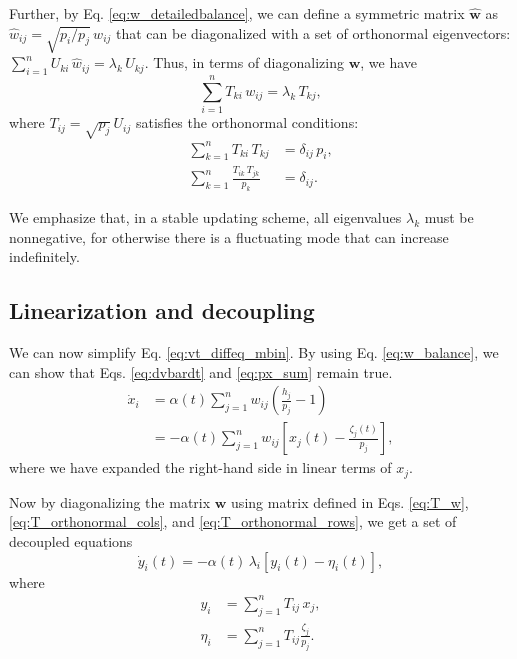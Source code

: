 \documentclass[reprint]{revtex4-1}
\begin{document}
Further, by Eq. \eqref{eq:w_detailedbalance},
we can define a symmetric matrix $\hat{\mathbf w}$
as $\hat w_{ij} = \sqrt{p_i/p_j} \, w_{ij}$
that can be diagonalized
with a set of orthonormal eigenvectors:
%
$\sum_{i = 1}^n U_{ki} \, \hat w_{ij} = \lambda_k \, U_{kj}$.
%
Thus,
in terms of diagonalizing $\mathbf w$, we have
\begin{equation}
  \sum_{i = 1}^n T_{ki} \, w_{ij} = \lambda_k \, T_{kj},
  \label{eq:T_w}
\end{equation}
where
$T_{ij} = \sqrt{p_j} \, U_{ij}$ satisfies
the orthonormal conditions:
%
\begin{align}
\sum_{k = 1}^n T_{ki} \, T_{kj}
&= \delta_{ij} \, p_i,
\label{eq:T_orthonormal_cols}
\\
\sum_{k = 1}^n \frac{ T_{ik} \, T_{jk} }{ p_k }
&= \delta_{ij}.
\label{eq:T_orthonormal_rows}
\end{align}



We emphasize that, in a stable updating scheme,
all eigenvalues $\lambda_k$ must be nonnegative,
for otherwise there is a fluctuating mode
that can increase indefinitely.



\subsection{Linearization and decoupling}



We can now simplify Eq. \eqref{eq:vt_diffeq_mbin}.
%
By using Eq. \eqref{eq:w_balance},
we can show that
Eqs. \eqref{eq:dvbardt} and \eqref{eq:px_sum}
remain true.
%
%
$$
\begin{aligned}
\dot x_i
&= \alpha(t) \sum_{j=1}^n w_{ij}
\left( \frac{ h_j } { p_j }  - 1 \right)
\\
&=
-\alpha(t) \sum_{j = 1}^n
w_{ij} \left[ x_j(t) - \frac{\zeta_j (t)}{p_j} \right],
\end{aligned}
$$
where
we have expanded the right-hand side
in linear terms of $x_j$.


Now by diagonalizing the matrix $\mathbf w$
using matrix defined in Eqs. \eqref{eq:T_w},
\eqref{eq:T_orthonormal_cols},
and
\eqref{eq:T_orthonormal_rows},
we get a set of decoupled equations
%
\begin{equation}
\dot y_i(t)
=
-\alpha(t) \, \lambda_i
[y_i(t) - \eta_i(t)],
\label{eq:yt_diffeq}
\end{equation}
%
where
\begin{align}
  y_i &= \sum_{j=1}^n T_{ij} \, x_j,
  \label{eq:y_def}
  \\
  \eta_i &= \sum_{j=1}^n T_{ij} \frac{ \zeta_j}{ p_j}.
  \label{eq:eta_def}
\end{align}
\end{document}
